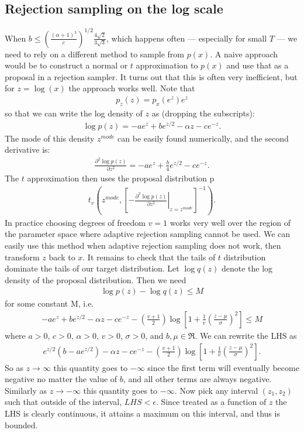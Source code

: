 \documentclass{article}
\begin{document}
\subsection{Rejection sampling on the log scale}

When $b \leq \left(\frac{(\alpha + 1)^3}{c}\right)^{1/2}\frac{4\sqrt{2}}{3\sqrt{3}}$, which happens often --- especially for small $T$ --- we need to rely on a different method to sample from $p(x)$. A naive approach would be to construct a normal or $t$ approximation to $p(x)$ and use that as a proposal in a rejection sampler. It turns out that this is often very inefficient, but for $z=\log(x)$ the approach works well. Note that
\begin{align*}
  p_z(z) = p_x(e^z)e^z
\end{align*}
so that we can write the log density of $z$ as (dropping the subscripts):
\begin{align*}
  \log p(z) = -ae^z + be^{z/2} - \alpha z - c e^{-z}.
\end{align*}
The mode of this density $z^{mode}$ can be easily found numerically, and the second derivative is:
\begin{align*}
  \frac{\partial^2 \log p(z)}{\partial z^2} = -ae^z + \frac{b}{4}e^{z/2} - c e^{-z}.
\end{align*}
The $t$ approximation then uses the proposal distribution 
p\begin{align*}
  t_{v}\left(z^{mode}, \left[-\left.\frac{\partial^2 \log p(z)}{\partial z^2}\right|_{z=z^{mode}}\right]^{-1}\right).
\end{align*}
In practice choosing degrees of freedom $v=1$ works very well over the region of the parameter space where adaptive rejection sampling cannot be used. We can easily use this method when adaptive rejection sampling does not work, then transform $z$ back to $x$. It remains to check that the tails of $t$ distribution dominate the tails of our target distribution. Let $\log q(z)$ denote the log density of the proposal distribution. Then we need
\begin{align*}
  \log p(z) - \log q(z) \leq M
\end{align*}
for some constant M, i.e.
\begin{align*}
  -ae^z + be^{z/2} - \alpha z - c e^{-z} -\left(\frac{v+1}{2}\right)\log\left[1 + \frac{1}{v}\left(\frac{z-\mu}{\sigma}\right)^2\right]\leq M
\end{align*}
where $a>0$, $c>0$, $\alpha>0$, $v>0$, $\sigma>0$, and $b,\mu\in \Re$. We can rewrite the LHS as
\begin{align*}
    e^{z/2}(b-ae^{z/2}) - \alpha z - c e^{-z} -\left(\frac{v+1}{2}\right)\log\left[1 + \frac{1}{v}\left(\frac{z-\mu}{\sigma}\right)^2\right].
\end{align*}
So as $z\to\infty$ this quantity goes to $-\infty$ since the first term will eventually become negative no matter the value of $b$, and all other terms are always negative. Similarly as $z\to -\infty$ this quantity goes to $-\infty$. Now pick any interval $(z_1,z_2)$ such that outside of the interval, $LHS<\epsilon$. Since treated as a function of $z$ the LHS is clearly continuous, it attains a maximum on this interval, and thus is bounded.
\end{document}
